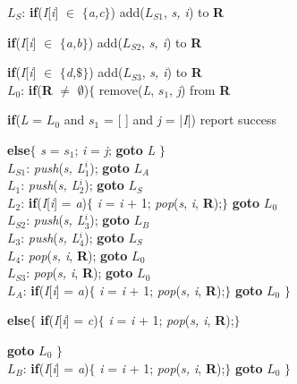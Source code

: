 $L_S$: \textbf{if}(\textit{I}[\textit{i}] $\in$ $\{$\textit{a,c}$\}$) add($L_{S1}$, \textit{s, i}) to \textbf{R} \par
\hspace{0.2cm}\textbf{if}(\textit{I}[\textit{i}] $\in$ $\{$\textit{a,b}$\}$) add(\textit{$L_{S2}$}, \textit{s, i}) to \textbf{R}\par
\hspace{0.2cm}\textbf{if}(\textit{I}[\textit{i}] $\in$ $\{$\textit{d,$\$$}$\}$) add(\textit{$L_{S3}$}, \textit{s, i}) to \textbf{R} \\
$L_0$: \textbf{if}(\textbf{R} $\ne$ $\emptyset$)$\{$ remove(\textit{L}, $s_1$, \textit{j}) from \textbf{R} \par
\hspace{2.2cm}\textbf{if}(\textit{L} = $L_0$ and $s_1$ = [ ] and \textit{j} = |\textit{I}|) report success \par
\hspace{2.2cm}\textbf{else}$\{$ \textit{s} = $s_1$; \textit{i} = \textit{j}; \textbf{goto} \textit{L} $\}$ \\
$L_{S1}$: \textit{push}(\textit{s, L$_1^{i}$}); \textbf{goto} $L_A$\\
$L_1$:  \textit{push}(\textit{s, L$_2^{i}$}); \textbf{goto} $L_S$\\
$L_2$:  \textbf{if}(\textit{I}[\textit{i}] = \textit{a})$\{$ \textit{i} = \textit{i} + 1; \textit{pop}(\textit{s}, \textit{i}, \textbf{R});$\}$ \textbf{goto} $L_0$ \\
$L_{S2}$: \textit{push}(\textit{s, L$_3^{i}$}); \textbf{goto} $L_B$\\
$L_3$:  \textit{push}(\textit{s, L$_4^{i}$}); \textbf{goto} $L_S$\\
$L_4$: \textit{pop}(\textit{s, i}, \textbf{R}); \textbf{goto} $L_0$ \\
$L_{S3}$: \textit{pop}(\textit{s, i}, \textbf{R}); \textbf{goto} $L_0$ \\
$L_A$:  \textbf{if}(\textit{I}[\textit{i}] = \textit{a})$\{$ \textit{i} = \textit{i} + 1; \textit{pop}(\textit{s, i}, \textbf{R});$\}$ \textbf{goto} $L_0$ $\}$ \par
\hspace{0.2cm} \textbf{else}$\{$ \textbf{if}(\textit{I}[\textit{i}] = \textit{c})$\{$ \textit{i} = \textit{i} + 1; \textit{pop}(\textit{s, i}, \textbf{R});$\}$ \par 
\hspace{1.5cm}\textbf{goto} $L_0$ $\}$ \\
$L_B$:  \textbf{if}(\textit{I}[\textit{i}] = \textit{a})$\{$ \textit{i} = \textit{i} + 1; \textit{pop}(\textit{s, i}, \textbf{R});$\}$ \textbf{goto} $L_0$ $\}$ \par
